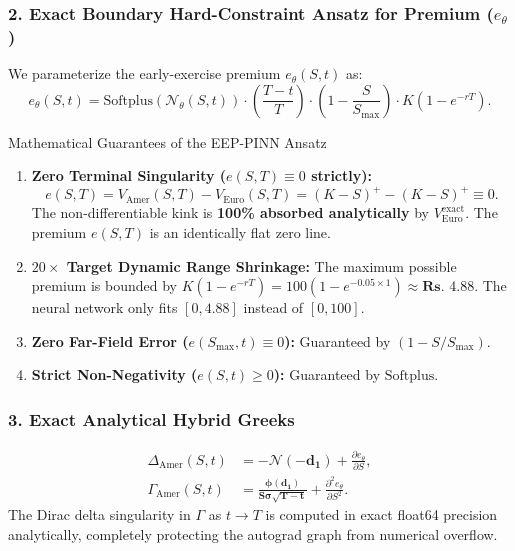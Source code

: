 \documentclass[11pt,a4paper]{article}
\begin{document}
\subsubsection{2. Exact Boundary Hard-Constraint Ansatz for Premium ($e_\theta$)}
We parameterize the early-exercise premium $e_\theta(S, t)$ as:
\begin{equation}
    \boxed{e_\theta(S, t) = \text{Softplus}\left(\mathcal{N}_\theta(S, t)\right) \cdot \left(\frac{T - t}{T}\right) \cdot \left(1 - \frac{S}{S_{\max}}\right) \cdot K\left(1 - e^{-rT}\right).}
\end{equation}

\begin{mathbox}{Mathematical Guarantees of the EEP-PINN Ansatz}
\begin{enumerate}[leftmargin=1.5em]
    \item \textbf{Zero Terminal Singularity ($e(S, T) \equiv 0$ strictly):}
    \begin{equation}
        e(S, T) = V_{\text{Amer}}(S, T) - V_{\text{Euro}}(S, T) = (K-S)^+ - (K-S)^+ \equiv 0.
    \end{equation}
    The non-differentiable kink is \textbf{100\% absorbed analytically} by $V_{\text{Euro}}^{\text{exact}}$. The premium $e(S, T)$ is an identically flat zero line.
    \item \textbf{$20\times$ Target Dynamic Range Shrinkage:}
    The maximum possible premium is bounded by $K(1 - e^{-rT}) = 100(1 - e^{-0.05 \times 1}) \approx \mathbf{\text{Rs. } 4.88}$. The neural network only fits $[0, 4.88]$ instead of $[0, 100]$.
    \item \textbf{Zero Far-Field Error ($e(S_{\max}, t) \equiv 0$):} Guaranteed by $(1 - S/S_{\max})$.
    \item \textbf{Strict Non-Negativity ($e(S, t) \ge 0$):} Guaranteed by $\text{Softplus}$.
\end{enumerate}
\end{mathbox}

\subsubsection{3. Exact Analytical Hybrid Greeks}
\begin{align}
    \Delta_{\text{Amer}}(S, t) &= \mathbf{-\mathcal{N}(-d_1)} + \frac{\partial e_\theta}{\partial S}, \\
    \Gamma_{\text{Amer}}(S, t) &= \mathbf{\frac{\phi(d_1)}{S \sigma \sqrt{T-t}}} + \frac{\partial^2 e_\theta}{\partial S^2}.
\end{align}
The Dirac delta singularity in $\Gamma$ as $t \to T$ is computed in exact float64 precision analytically, completely protecting the autograd graph from numerical overflow.
\end{document}
